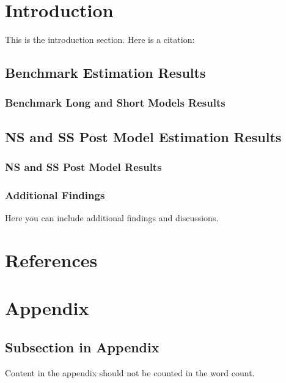\documentclass{article}%
\begin{document}
%
\newpage%
\listoffigures%
\newpage%
\listoftables%
\newpage%
%
\pagestyle{mainmatter}%
\section{Introduction}%
\label{sec:Introduction}%
This is the introduction section. Here is a citation: %
\cite{example_reference}

%
\subsection{Benchmark Estimation Results}%
\label{subsec:BenchmarkEstimationResults}%
\subsubsection{Benchmark Long and Short Models Results}%
\label{ssubsec:BenchmarkLongandShortModelsResults}%


%
\subsection{NS and SS Post Model Estimation Results}%
\label{subsec:NSandSSPostModelEstimationResults}%
\subsubsection{NS and SS Post Model Results}%
\label{ssubsec:NSandSSPostModelResults}%


%
\newpage%
\subsubsection{Additional Findings}%
\label{ssubsec:AdditionalFindings}%
Here you can include additional findings and discussions.

%
\newpage%
\section{References}%
\label{sec:References}%
\printbibliography

%
\newpage%
\section{Appendix}%
\label{sec:Appendix}%
\subsection{Subsection in Appendix}%
\label{subsec:SubsectioninAppendix}%
Content in the appendix should not be counted in the word count.

%
\end{document}

